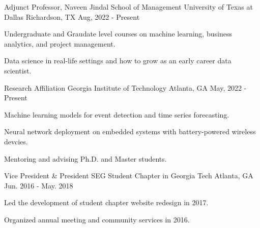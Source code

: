 

\begin{cventries}

  \cventry
    {Adjunct Professor, Naveen Jindal School of Management} %
    {University of Texas at Dallas} %
    {Richardson, TX} %
    {Aug, 2022 - Present} %
    {
      \begin{cvitems} %
        \item {Undergraduate and Graudate level courses on machine learning, business analytics, and project management.}
				\item {Data science in real-life settings and how to grow as an early career data scientist.}
      \end{cvitems}
    }

  \cventry
    {Research Affiliation} %
    {Georgia Institute of Technology} %
    {Atlanta, GA} %
    {May, 2022 - Present} %
    {
      \begin{cvitems} %
        \item {Machine learning models for event detection and time series forecasting.}
				\item {Neural network deployment on embedded systems with battery-powered wireless devcies.}
				\item {Mentoring and advising Ph.D. and Master students.}
      \end{cvitems}
    }

  \cventry
    {Vice President \& President} %
    {SEG Student Chapter in Georgia Tech} %
    {Atlanta, GA} %
    {Jun. 2016 - May. 2018} %
    {
      \begin{cvitems} %
        \item {Led the development of student chapter website redesign in 2017.}
        \item {Organized annual meeting and community services in 2016.}
      \end{cvitems}
    }


\end{cventries}
